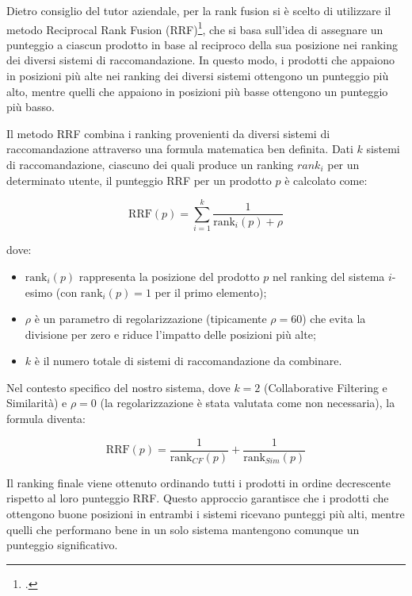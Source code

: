 Dietro consiglio del tutor aziendale, per la rank fusion si è scelto di utilizzare il metodo Reciprocal Rank Fusion (RRF)\footcite{site:rrf-explained}, che si basa sull'idea di assegnare un punteggio a ciascun prodotto in base al reciproco della sua posizione nei ranking dei diversi sistemi di raccomandazione. In questo modo, i prodotti che appaiono in posizioni più alte nei ranking dei diversi sistemi ottengono un punteggio più alto, mentre quelli che appaiono in posizioni più basse ottengono un punteggio più basso.

Il metodo RRF combina i ranking provenienti da diversi sistemi di raccomandazione attraverso una formula matematica ben definita. Dati $k$ sistemi di raccomandazione, ciascuno dei quali produce un ranking $rank_i$ per un determinato utente, il punteggio RRF per un prodotto $p$ è calcolato come:

\begin{equation}
\text{RRF}(p) = \sum_{i=1}^{k} \frac{1}{\text{rank}_i(p) + \rho}
\end{equation}

dove:
\begin{itemize}
    \item $\text{rank}_i(p)$ rappresenta la posizione del prodotto $p$ nel ranking del sistema $i$-esimo (con $\text{rank}_i(p) = 1$ per il primo elemento);
    \item $\rho$ è un parametro di regolarizzazione (tipicamente $\rho = 60$) che evita la divisione per zero e riduce l'impatto delle posizioni più alte;
    \item $k$ è il numero totale di sistemi di raccomandazione da combinare.
\end{itemize}

Nel contesto specifico del nostro sistema, dove $k = 2$ (Collaborative Filtering e Similarità) e $\rho = 0$ (la regolarizzazione è stata valutata come non necessaria), la formula diventa:

\begin{equation}
\text{RRF}(p) = \frac{1}{\text{rank}_{CF}(p)} + \frac{1}{\text{rank}_{Sim}(p)}
\end{equation}

Il ranking finale viene ottenuto ordinando tutti i prodotti in ordine decrescente rispetto al loro punteggio RRF. Questo approccio garantisce che i prodotti che ottengono buone posizioni in entrambi i sistemi ricevano punteggi più alti, mentre quelli che performano bene in un solo sistema mantengono comunque un punteggio significativo.

